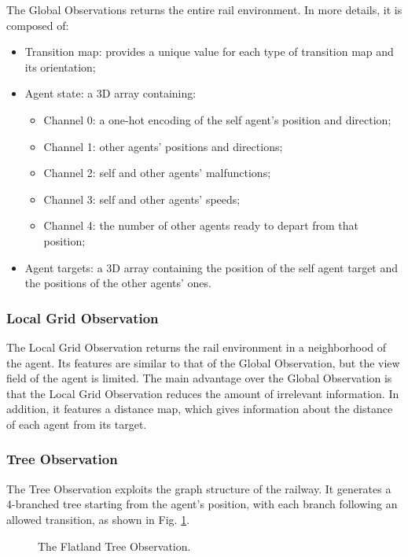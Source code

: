 \documentclass[a4paper, 12pt]{article}
\numberwithin{equation}{section}
\begin{document}
The Global Observations returns the entire rail environment. In more details, it is composed of:
\begin{itemize}
	\item Transition map: provides a unique value for each type of transition map and its orientation;
	\item Agent state: a 3D array containing:
	\begin{itemize}
		\item Channel 0: a one-hot encoding of the self agent's position and direction;
		\item Channel 1: other agents' positions and directions;
		\item Channel 2: self and other agents' malfunctions;
		\item Channel 3: self and other agents' speeds;
		\item Channel 4: the number of other agents ready to depart from that position;
	\end{itemize}
	\item Agent targets: a 3D array containing the position of the self agent target and the positions of the other agents' ones.
\end{itemize}

\subsubsection{Local Grid Observation}

The Local Grid Observation returns the rail environment in a neighborhood of the agent. Its features are similar to that of the Global Observation, but the view field of the agent is limited. The main advantage over the Global Observation is that the Local Grid Observation reduces the amount of irrelevant information. In addition, it features a distance map, which gives information about the distance of each agent from its target.


\subsubsection{Tree Observation}

The Tree Observation exploits the graph structure of the railway. It generates a 4-branched tree starting from the agent's position, with each branch following an allowed transition, as shown in Fig. \ref{fig:tree}.

\begin{figure}[h]
	\centering
		\caption{The Flatland Tree Observation.}
	\label{fig:tree}
\end{figure}
\end{document}
